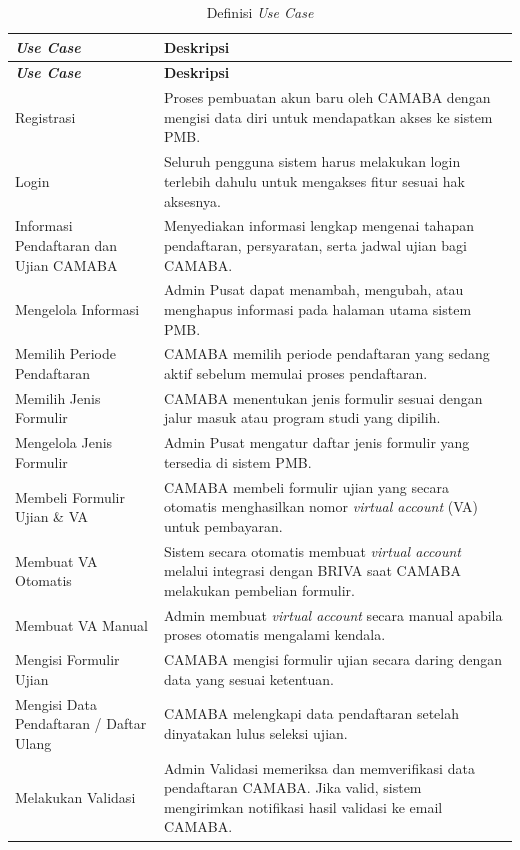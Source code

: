 \begin{longtable}{|p{}|p{}|}
	\caption{Definisi \textit{Use Case}}
	\label{table:3.definisiusecase}\\
	\hline
	\textbf{\textit{Use Case}} & \textbf{Deskripsi} \\
	\hline
	\endfirsthead
	\hline
	\textbf{\textit{Use Case}} & \textbf{Deskripsi} \\
	\hline
	\endhead
	Registrasi & Proses pembuatan akun baru oleh CAMABA dengan mengisi data diri untuk mendapatkan akses ke sistem PMB. \\
	\hline
	Login & Seluruh pengguna sistem harus melakukan login terlebih dahulu untuk mengakses fitur sesuai hak aksesnya. \\
	\hline
	Informasi Pendaftaran dan Ujian CAMABA & Menyediakan informasi lengkap mengenai tahapan pendaftaran, persyaratan, serta jadwal ujian bagi CAMABA. \\
	\hline
	Mengelola Informasi & Admin Pusat dapat menambah, mengubah, atau menghapus informasi pada halaman utama sistem PMB. \\
	\hline
	Memilih Periode Pendaftaran & CAMABA memilih periode pendaftaran yang sedang aktif sebelum memulai proses pendaftaran. \\
	\hline
	Memilih Jenis Formulir & CAMABA menentukan jenis formulir sesuai dengan jalur masuk atau program studi yang dipilih. \\
	\hline
	Mengelola Jenis Formulir & Admin Pusat mengatur daftar jenis formulir yang tersedia di sistem PMB. \\
	\hline
	Membeli Formulir Ujian \& VA & CAMABA membeli formulir ujian yang secara otomatis menghasilkan nomor \textit{virtual account} (VA) untuk pembayaran. \\
	\hline
	Membuat VA Otomatis & Sistem secara otomatis membuat \textit{virtual account} melalui integrasi dengan BRIVA saat CAMABA melakukan pembelian formulir. \\
	\hline
	Membuat VA Manual & Admin membuat \textit{virtual account} secara manual apabila proses otomatis mengalami kendala. \\
	\hline
	Mengisi Formulir Ujian & CAMABA mengisi formulir ujian secara daring dengan data yang sesuai ketentuan. \\
	\hline
	Mengisi Data Pendaftaran / Daftar Ulang & CAMABA melengkapi data pendaftaran setelah dinyatakan lulus seleksi ujian. \\
	\hline
	Melakukan Validasi & Admin Validasi memeriksa dan memverifikasi data pendaftaran CAMABA. Jika valid, sistem mengirimkan notifikasi hasil validasi ke email CAMABA. \\

\end{longtable}
